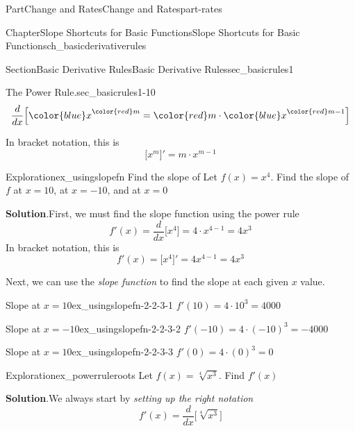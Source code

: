 \documentclass[oneside,10pt,]{tufte-book}
\newcommand{\blocktitlefont}{\relax}
\numberwithin{equation}{chapter}
\newcommand{\ddx}[1]{ \dfrac{d}{dx} \Big[ #1 \Big]  }
\newcommand{\D}[1]{ \Big[ #1 \Big]'  }
\begin{document}
\begin{partptx}{Part}{Change and Rates}{}{Change and Rates}{}{}{part-rates}
\begin{chapterptx}{Chapter}{Slope Shortcuts for Basic Functions}{}{Slope Shortcuts for Basic Functions}{}{}{ch_basicderivativerules}
\begin{sectionptx}{Section}{Basic Derivative Rules}{}{Basic Derivative Rules}{}{}{sec_basicrules1}
\begin{paragraphs}{The Power Rule.}{sec_basicrules1-10}
\begin{equation*}
\dfrac{d}{dx}\Big[   {\color{blue} x}^{\color{red} m}= {\color{red} m} \cdot {\color{blue} x}^{{\color{red} m}-1} \Big] 
\end{equation*}
%
\par
In bracket notation, this is%
\begin{equation*}
\D{x^m} = m \cdot x^{m-1}
\end{equation*}
%
\end{paragraphs}%
\begin{exploration}{Exploration}{}{ex_usingslopefn}%
Find the slope of Let \(f(x) = x^4\).  Find the slope of \(f\) at \(x=10\), at \(x=-10\), and at \(x=0\)%
\par\smallskip%
\noindent\textbf{\blocktitlefont Solution}.\hypertarget{ex_usingslopefn-2}{}\quad{}First, we must find the slope function using the power rule%
\begin{equation*}
f'(x) = \ddx{x^4} = 4 \cdot x^{4-1} = 4 x^3
\end{equation*}
In bracket notation, this is%
\begin{equation*}
f'(x) = \D{x^4} = 4 x^{4-1} = 4x^3
\end{equation*}
%
\par
Next, we can use the  \emph{slope function} to find the slope at each given \(x\) value.%
\begin{descriptionlist}
\begin{dlimedium}{Slope at \(x=10\)}{ex_usingslopefn-2-2-3-1}%
\(\displaystyle f'(10) = 4 \cdot 10^3 = 4000 \)%
\end{dlimedium}%
\begin{dlimedium}{Slope at \(x=-10\)}{ex_usingslopefn-2-2-3-2}%
\(\displaystyle f'(-10) = 4 \cdot (-10)^3 = -4000 \)%
\end{dlimedium}%
\begin{dlimedium}{Slope at \(x=10\)}{ex_usingslopefn-2-2-3-3}%
\(\displaystyle f'(0) = 4 \cdot (0)^3 = 0 \)%
\end{dlimedium}%
\end{descriptionlist}
%
\end{exploration}%
\begin{exploration}{Exploration}{}{ex_powerruleroots}%
Let \(f(x) = \sqrt[4]{x^3} \). Find \(f'(x)\)%
\par\smallskip%
\noindent\textbf{\blocktitlefont Solution}.\hypertarget{ex_powerruleroots-2}{}\quad{}We always start by \emph{setting up the right notation}%
\begin{equation*}
f'(x) = \dfrac{d}{dx}\Big[  \sqrt[4]{x^3} \Big]
\end{equation*}

\end{exploration}
\end{sectionptx}
\end{chapterptx}
\end{partptx}
\end{document}

